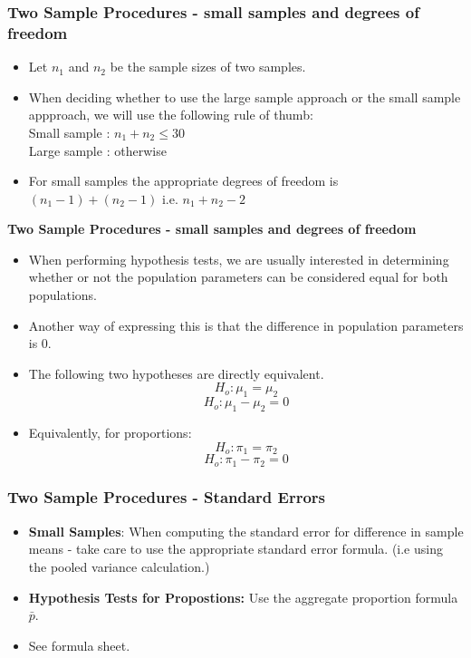 \documentclass[a4]{beamer}
\begin{document}
\begin{frame}
\frametitle{Two Sample Procedures - small samples and degrees of freedom}
\begin{itemize}
\item Let $n_1$ and $n_2$ be the sample sizes of two samples.
\item When deciding whether to use the large sample approach or the small sample appproach, we will use the following rule of thumb: \\
Small sample : $n_1+n_2 \leq 30$\\
Large sample : otherwise\\
\item For small samples the appropriate degrees of freedom is $(n_1-1) + (n_2-1)$ i.e. $n_1 + n_2-2$ 
\end{itemize}
\end{frame}
\begin{frame}
\textbf{Two Sample Procedures - small samples and degrees of freedom}
\begin{itemize}
\item When performing hypothesis tests, we are usually interested in determining whether or not the population parameters can be considered equal for both populations.
\item Another way of expressing this is that the difference in population parameters is 0. 
\item The following two hypotheses are directly equivalent.
\[ H_o :  \mu_1 = \mu_2\]
\[ H_o :  \mu_1 - \mu_2 =0\]
\item Equivalently, for proportions:
\[ H_o :  \pi_1 = \pi_2\]
\[ H_o :  \pi_1 - \pi_2 =0\]
\end{itemize}
\end{frame}
\begin{frame}
\frametitle{Two Sample Procedures - Standard Errors}
\begin{itemize}
\item \textbf{Small Samples}: When computing the standard error for difference in sample means - take care to use the appropriate standard error formula. (i.e using the pooled variance calculation.)
\item \textbf{Hypothesis Tests for Propostions:} Use the aggregate proportion formula $\bar{p}$.
\item See formula sheet.
\end{itemize}
\end{frame}
\end{document}
